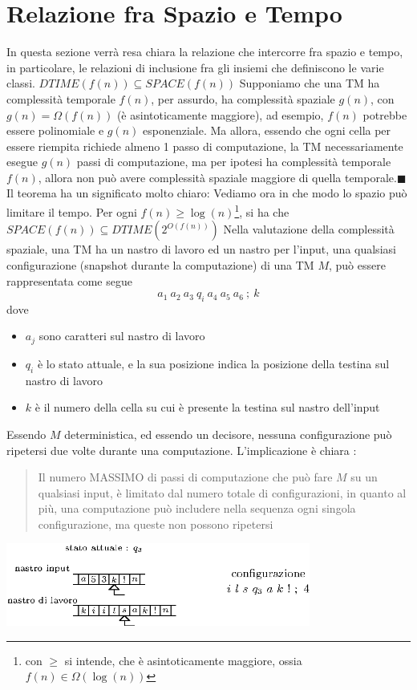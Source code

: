 \documentclass[10pt, letterpaper]{report}
\begin{document}
\section{Relazione fra Spazio e Tempo}
In questa sezione verrà resa chiara la relazione che intercorre fra spazio e tempo, in particolare, le relazioni di inclusione fra gli insiemi che definiscono le varie classi.  \acc 
\teo{} $DTIME(f(n))\subseteq SPACE(f(n))$\acc 
\dimo{} Supponiamo che una TM ha complessità temporale $f(n)$, per assurdo, ha complessità spaziale $g(n)$, con $g(n)=\Omega(f(n))$ (è asintoticamente maggiore), ad esempio, $f(n)$ potrebbe essere polinomiale e $g(n)$ esponenziale.  \acc 
Ma allora, essendo che ogni cella per essere riempita richiede almeno 1 passo di computazione, la TM necessariamente esegue $g(n)$ passi di computazione, ma per ipotesi ha complessità temporale $f(n)$, allora non può avere complessità spaziale maggiore di quella temporale.\hfill$\blacksquare$\acc   
Il  teorema ha un significato molto chiaro:
Vediamo ora in che modo lo spazio può limitare il tempo. \acc
\teo{} Per ogni $f(n)\ge \log(n)$\footnote{con $\ge$ si intende, che è asintoticamente maggiore, ossia $f(n)\in\Omega(\log(n))$}, si ha che $SPACE(f(n))\subseteq DTIME(2^{O(f(n))})$\acc 
\dimo{} Nella valutazione della complessità spaziale, una TM ha un nastro di lavoro ed un nastro per l'input, una qualsiasi configurazione (snapshot durante la computazione) di una TM $M$, può essere rappresentata come segue 
$$ a_1 \ a_2 \ a_3 \ q_i \ a_4 \ a_5 \ a_6 \ ;\ k$$
dove \begin{itemize}
    \item $a_j$ sono caratteri sul nastro di lavoro 
    \item $q_i$ è lo stato attuale, e la sua posizione indica la posizione della testina sul nastro di lavoro 
    \item $k$ è il numero della cella su cui è presente la testina sul nastro dell'input
\end{itemize}
Essendo $M$ deterministica, ed essendo un decisore, nessuna configurazione può ripetersi due volte durante una computazione. L'implicazione è chiara :\begin{quote}
    Il numero MASSIMO di passi di computazione che può fare $M$ su un qualsiasi input, è limitato dal numero totale di configurazioni, in quanto al più, una computazione può includere nella sequenza ogni singola configurazione, ma queste non possono ripetersi
\end{quote}\begin{center}
    \includegraphics[width=0.75\textwidth ]{images/confTM2.eps}
\end{center}
\end{document}
